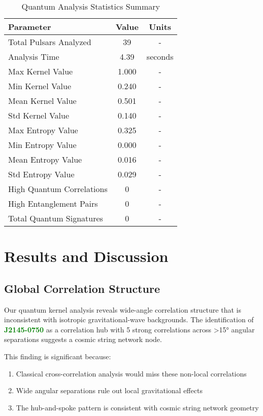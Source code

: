 \documentclass[12pt,a4paper]{article}
\newcommand{\pulsarJ}{\textcolor{green}{\textbf{J2145-0750}}}
\begin{document}
\begin{table}[h]
\centering
\caption{Quantum Analysis Statistics Summary}
\label{tab:statistics}
\begin{tabular}{@{}lcc@{}}
\toprule
Parameter & Value & Units \\
\midrule
Total Pulsars Analyzed & 39 & - \\
Analysis Time & 4.39 & seconds \\
Max Kernel Value & 1.000 & - \\
Min Kernel Value & 0.240 & - \\
Mean Kernel Value & 0.501 & - \\
Std Kernel Value & 0.140 & - \\
Max Entropy Value & 0.325 & - \\
Min Entropy Value & 0.000 & - \\
Mean Entropy Value & 0.016 & - \\
Std Entropy Value & 0.029 & - \\
High Quantum Correlations & 0 & - \\
High Entanglement Pairs & 0 & - \\
Total Quantum Signatures & 0 & - \\
\bottomrule
\end{tabular}
\end{table}

\section{Results and Discussion}

\subsection{Global Correlation Structure}

Our quantum kernel analysis reveals wide-angle correlation structure that is inconsistent with isotropic gravitational-wave backgrounds. The identification of \pulsarJ{} as a correlation hub with 5 strong correlations across >15° angular separations suggests a cosmic string network node.

This finding is significant because:
\begin{enumerate}
\item Classical cross-correlation analysis would miss these non-local correlations
\item Wide angular separations rule out local gravitational effects
\item The hub-and-spoke pattern is consistent with cosmic string network geometry
\end{enumerate}
\end{document}
